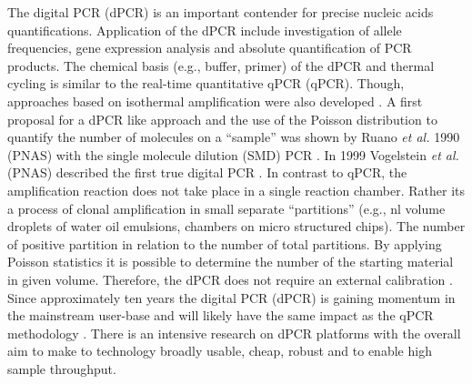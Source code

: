 \documentclass[a4,center,fleqn]{NAR}
\begin{document}
The digital PCR (dPCR) is an important contender for precise nucleic acids 
quantifications. Application of the dPCR include investigation of allele 
frequencies, gene expression analysis and absolute quantification of PCR 
products. The chemical basis (e.g., buffer, primer) of the dPCR and thermal 
cycling is similar to the real-time quantitative qPCR (qPCR). Though, approaches 
based on isothermal amplification were also developed 
\cite{pabinger_survey_2014, rodiger_r_2015}. A first proposal for a dPCR like 
approach and the use of the Poisson distribution to quantify the number of 
molecules on a ``sample'' was shown by Ruano \textit{et al.} 1990 (PNAS) with 
the single molecule dilution (SMD) PCR \cite{ruano_haplotype_1990}. In 1999 
Vogelstein \textit{et al.} (PNAS) described the first true digital PCR 
\cite{vogelstein_digital_1999}. In contrast to qPCR, the amplification reaction 
does not take place in a single reaction chamber. Rather its a process of clonal 
amplification in small separate ``partitions'' (e.g., nl volume droplets of 
water oil emulsions, chambers on micro structured chips). The number of positive 
partition in relation to the number of total partitions. By applying Poisson 
statistics it is possible to determine the number of the starting material in 
given volume. Therefore, the dPCR does not require an external calibration 
\cite{selck_increased_2013, rodiger_r_2015}. Since approximately ten years the 
digital PCR (dPCR) is gaining momentum in the mainstream user-base and will 
likely have the same impact as the qPCR methodology \cite{huggett_qpcr_2015, 
morley_digital_2014, rodiger_r_2015}. There is an intensive research on dPCR 
platforms with the overall aim to make to technology broadly usable, cheap, 
robust and to enable high sample throughput.

\enlargethispage{-65.1pt}
  
\end{document}
